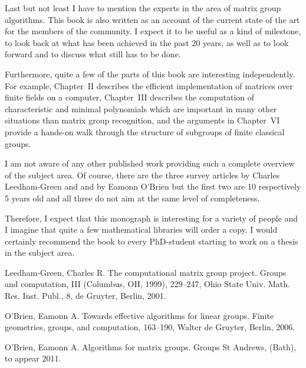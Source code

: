 \documentclass[11pt]{article}
\begin{document}
Last but not least I have to mention the experts in the area of
matrix group algorithms.
This book is also written as an account of the current
state of the art for the members of the community.
I expect it to be useful as a kind of milestone, to look back at what has
been achieved in the past 20 years, as well as to look forward and to
discuss what still has to be done.

Furthermore, quite a few of the parts of this book are interesting
independently. For example, Chapter~II describes the efficient implementation 
of matrices over finite fields on a computer, Chapter~III describes
the computation of characteristic and minimal polynomials which
are important in many other situations than matrix group recognition, 
and the arguments in Chapter~VI provide a hands-on walk through the
structure of subgroups of finite classical groups.

I am not aware of any other published work providing such a complete
overview of the subject area. Of course, there are the three survey
articles \cite{CLG} by Charles Leedham-Green and \cite{EOB} and
\cite{EOBBath}
by Eamonn O'Brien but the
first two are 10 respectively 5 years old and all three do not aim 
at the same level of completeness.

Therefore, I expect that this monograph is interesting for a
variety of people and I imagine that quite a few mathematical
libraries will order a copy. I would certainly recommend the book
to every PhD-student starting to work on a thesis in the subject area.

\begin{thebibliography}{[1]}
 Leedham-Green, Charles R.  \newblock
 The computational matrix group project. \newblock
 Groups and computation, III (Columbus, OH, 1999), 
 229--247, Ohio State Univ. Math. Res. Inst. Publ., 8, de Gruyter,
Berlin,  2001. 
                
 O'Brien, Eamonn A. \newblock
 Towards effective algorithms for linear groups. \newblock
 Finite geometries, groups, and computation, 
 163--190, Walter de Gruyter, Berlin,  2006. 

 O'Brien, Eamonn A. \newblock
 Algorithms for matrix groups. \newblock
 Groups St Andrews, (Bath), to appear 2011.

\end{thebibliography}
\end{document}
